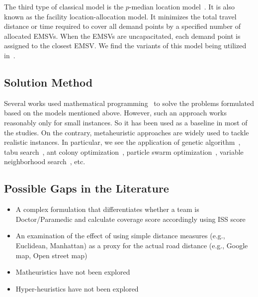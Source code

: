 The third type of classical model is the $ p $-median location model~\cite{hakimi1964optimum}. It is also known as the facility location-allocation model. It minimizes the total travel distance or time required to cover all demand points by a specified number of allocated EMSVs. When the EMSVs are uncapacitated, each demand point is assigned to the closest EMSV. We find the variants of this model being utilized in~\cite{pacheco2015solving, andersson2007decision, schmid2012solving, zhi2015multi, toro2013joint}.



\subsection{Solution Method}

Several works used mathematical programming~\cite{roislien2018comparing, van2019improving, naoum2013stochastic, zhi2015multi} to solve the problems formulated based on the models mentioned above. However, such an approach works reasonably only for small instances. So it has been used as a baseline in most of the studies. On the contrary, metaheuristic approaches are widely used to tackle realistic instances. In particular, we see the application of genetic algorithm~\cite{toro2013joint, benabdouallah2017comparison, pacheco2015solving, iannoni2009optimization}, tabu search~\cite{rajagopalan2008multiperiod, rajagopalan2011ambulance, erdougan2010scheduling, doerner2005heuristic}, ant colony optimization~\cite{doerner2005heuristic, benabdouallah2017comparison, benabdouallah2016deployment}, particle swarm optimization~\cite{hatta2013solving}, variable neighborhood search~\cite{schmid2012solving}, etc.

\subsection{Possible Gaps in the Literature}

\begin{itemize}
	
	\item A complex formulation that differentiates whether a team is Doctor/Paramedic and calculate coverage score accordingly using ISS score
	
	\item An examination of the effect of using simple distance measures (e.g., Euclidean, Manhattan) as a proxy for the actual road distance (e.g., Google map, Open street map)
	
	\item Matheuristics have not been explored
	
	\item Hyper-heuristics have not been explored
	
\end{itemize}

